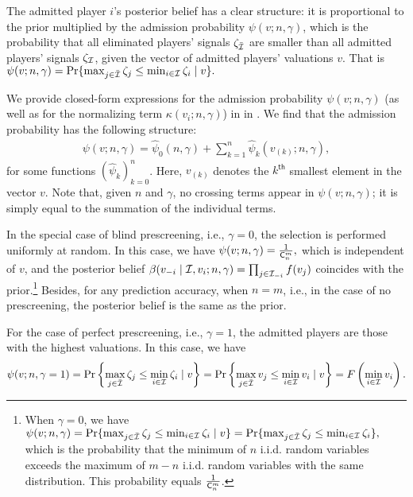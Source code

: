 The admitted player $i$'s posterior belief has a clear structure: it is proportional to the prior multiplied by the admission probability $\psi(v;n,\gamma)$, which is the probability that all eliminated players' signals $\zeta_{\Bar{\mathcal{I}}}$ are smaller than all admitted players' signals $\zeta_{\mathcal{I}}$, given the vector of admitted players' valuations $v$. That is $\psi(v;n,\gamma)=\Pr\{
\max_{j\in \Bar{\mathcal{I}}} \zeta_j \leq \min_{i\in \mathcal{I}}\zeta_i \mid v\}.$



We provide closed-form expressions for the admission probability $\psi(v;n,\gamma)$ (as well as for the normalizing term $\kappa(v_i;n,\gamma)$) in  in . We find that the admission probability has the following structure:
\begin{align}
\label{eq:admissionprob_summation}
\psi(v;n,\gamma)=\hat{\psi}_0(n,\gamma)+\sum_{k=1}^n \hat{\psi}_k(v_{(k)};n,\gamma),
\end{align}
for some functions $(\hat{\psi}_k)_{k=0}^n$. Here, $v_{(k)}$ denotes the $k^{\mathsf{th}}$ smallest element in the vector $v$. Note that, given $n$ and $\gamma$, no crossing terms appear in $\psi(v;n,\gamma)$; it is simply equal to the summation of the individual terms.

In the special case of blind prescreening, i.e., $\gamma=0$, the selection is performed uniformly at random. In this case, we have $\psi(v;n,\gamma)=\frac{1}{\mathsf{C}^m_n},$
which is independent of $v$, and the posterior belief
$\beta(v_{-i}\mid \mathcal{I},v_i;n,\gamma)=\prod_{j\in \mathcal{I}_{-i}}f(v_j)$
coincides with the prior.\footnote{When $\gamma=0$, we have $\psi(v;n,\gamma)=\Pr\{
\max_{j\in \Bar{\mathcal{I}}} \zeta_j \leq \min_{i\in \mathcal{I}}\zeta_i \mid v\}
=\Pr\{
\max_{j\in \Bar{\mathcal{I}}} \zeta_j \leq \min_{i\in \mathcal{I}}\zeta_i\},$
which is the probability that the minimum of $n$ i.i.d. random variables exceeds the maximum of $m-n$ i.i.d. random variables with the same distribution. This probability equals $\frac{1}{\mathsf{C}^m_n}$.}
Besides, for any prediction accuracy, when $n=m$, i.e., in the case of no prescreening, the posterior belief is the same as the prior.

For the case of perfect prescreening, i.e., $\gamma=1$, the admitted players are those with the highest valuations. In this case, we have
\begin{align}
\label{eq:gamma_1_admissionprob}
\psi(v;n,\gamma=1)
=\Pr\left\{
\max_{j\in \Bar{\mathcal{I}}} \zeta_j \leq \min_{i\in \mathcal{I}}\zeta_i \mid v\right\}
=\Pr\left\{
\max_{j\in \Bar{\mathcal{I}}} v_j \leq \min_{i\in \mathcal{I}}v_i \mid v\right\}
=F\left(\min_{i\in \mathcal{I}}v_i\right).
\end{align}





